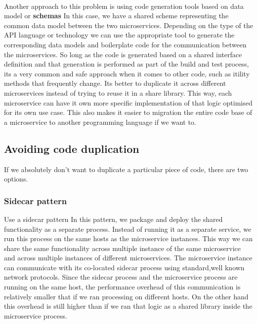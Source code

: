 \paragraph{}
Another approach to this problem is using code generation tools based on data model or \textbf{schemas}
In this case, we have a shared scheme representing the common data model between the two microservices.
Depending on the type of the API language or technology we can use the appropriate tool to generate the corresponding data models and boilerplate code for the communication between the microservices.
So long as the code is generated based on a shared interface definition and that generation is performed as part of the build and test process, its a very common and safe approach when it comes to other code, such as itility methods that frequently change.
Its better to duplicate it across different microservices instead of trying to reuse it in a share library.
This way, each microservice can have it own more specific implementation of that logic optimised for its own use case.
This also makes it easier to migration the entire code base of a microservice to another programming language if we want to.

\subsection{Avoiding code duplication}
If we absolutely don't want to duplicate a particular piece of code, there are two options.

\subsubsection{Sidecar pattern}
Use a sidecar pattern
In this pattern, we package and deploy the shared functionality as a separate process.
Instead of running it as a separate service, we run this process on the same hosts as the microservice instances.
This way we can share the same functionality across multiple instance of the same microservice and across multiple instances of different microservices.
The microservice instance can communicate with its co-located sidecar process using standard,well known network protocols.
Since the sidecar process and the microservice process are running on the same host, the performance overhead of this communication is relatively smaller that if we ran processing on different hosts.
On the other hand this overhead is still higher than if we ran that logic as a shared library inside the microservice process.

